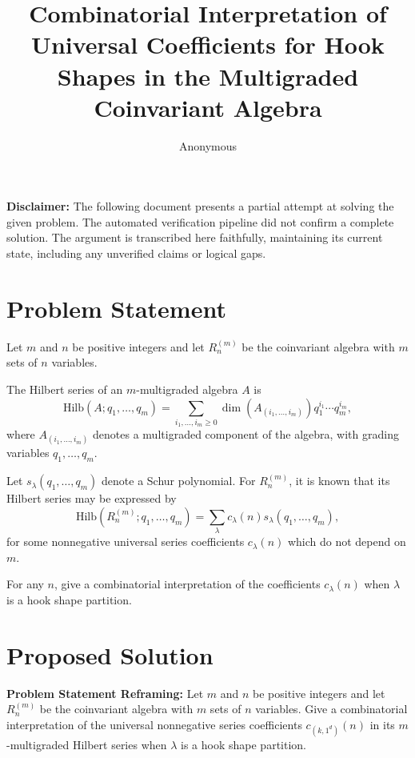 \documentclass[12pt]{article}
\title{Combinatorial Interpretation of Universal Coefficients for Hook Shapes in the Multigraded Coinvariant Algebra}
\author{Anonymous}
\date{}
\begin{document}
\maketitle

\begin{center}
    \textbf{Disclaimer:} The following document presents a partial attempt at solving the given problem. The automated verification pipeline did not confirm a complete solution. The argument is transcribed here faithfully, maintaining its current state, including any unverified claims or logical gaps.
\end{center}

\section*{Problem Statement}

Let $m$ and $n$ be positive integers and let $R_n^{(m)}$ be the coinvariant algebra with $m$ sets of $n$ variables.

The Hilbert series of an $m$-multigraded algebra $A$ is
\[
\mathrm{Hilb}(A;q_1,\ldots ,q_m)= \sum_{i_1,\ldots,i_m \geq 0} \dim(A_{(i_1,\ldots,i_m)})q_1^{i_1} \cdots q_m^{i_m},
\]
where $A_{(i_1,\ldots,i_m)}$ denotes a multigraded component of the algebra, with grading variables $q_1,\ldots, q_m$.

Let $s_\lambda(q_1,\ldots ,q_m)$ denote a Schur polynomial. For $R_n^{(m)}$, it is known that its Hilbert series may be expressed by 
\[
\mathrm{Hilb}(R_n^{(m)};q_1,\ldots ,q_m)= \sum_{\lambda}
c_{\lambda}(n)s_\lambda(q_1,\ldots ,q_m),
\]
for some nonnegative universal series coefficients $c_\lambda(n)$ which do not depend on $m$.

For any $n$, give a combinatorial interpretation of the coefficients $c_{\lambda}(n)$ when $\lambda$ is a hook shape partition.

\section*{Proposed Solution}

\textbf{Problem Statement Reframing:} Let $m$ and $n$ be positive integers and let $R_n^{(m)}$ be the coinvariant algebra with $m$ sets of $n$ variables. Give a combinatorial interpretation of the universal nonnegative series coefficients $c_{(k, 1^d)}(n)$ in its $m$-multigraded Hilbert series when $\lambda$ is a hook shape partition.
\end{document}
